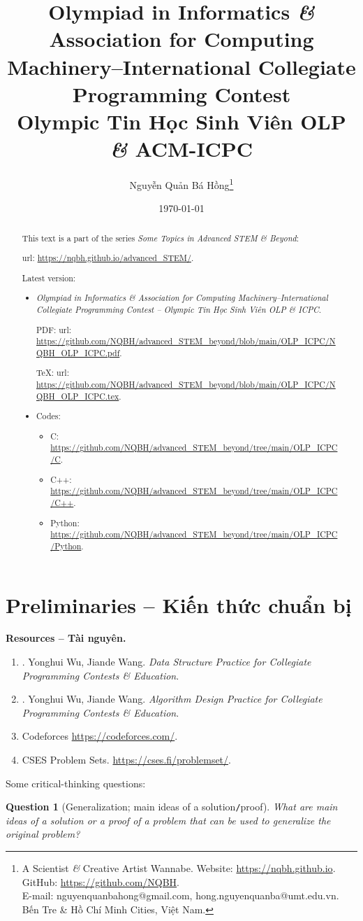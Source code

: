 \documentclass{article}
\title{Olympiad in Informatics {\it\&} Association for Computing Machinery--International Collegiate Programming Contest\\Olympic Tin Học Sinh Viên OLP {\it\&} ACM-ICPC}
\author{Nguyễn Quản Bá Hồng\footnote{A Scientist {\it\&} Creative Artist Wannabe. Website: \url{https://nqbh.github.io}. GitHub: \url{https://github.com/NQBH}.\\E-mail: {\sf nguyenquanbahong@gmail.com, hong.nguyenquanba@umt.edu.vn}. Bến Tre \& Hồ Chí Minh Cities, Việt Nam.}}
\date{\today}
\newtheorem{question}{Question}
\begin{document}
\maketitle
\begin{abstract}
	This text is a part of the series {\it Some Topics in Advanced STEM \& Beyond}:
	
	{\sc url}: \url{https://nqbh.github.io/advanced_STEM/}.
	
	Latest version:
	\begin{itemize}
		\item {\it Olympiad in Informatics \& Association for Computing Machinery--International Collegiate Programming Contest -- Olympic Tin Học Sinh Viên OLP \& ICPC}.
		
		PDF: {\sc url}: \url{https://github.com/NQBH/advanced_STEM_beyond/blob/main/OLP_ICPC/NQBH_OLP_ICPC.pdf}.
		
		\TeX: {\sc url}: \url{https://github.com/NQBH/advanced_STEM_beyond/blob/main/OLP_ICPC/NQBH_OLP_ICPC.tex}.
		\item Codes:
		\begin{itemize}
			\item C: \url{https://github.com/NQBH/advanced_STEM_beyond/tree/main/OLP_ICPC/C}.
			\item C++: \url{https://github.com/NQBH/advanced_STEM_beyond/tree/main/OLP_ICPC/C++}.
			\item Python: \url{https://github.com/NQBH/advanced_STEM_beyond/tree/main/OLP_ICPC/Python}.
		\end{itemize}
	\end{itemize}
\end{abstract}
\tableofcontents


\section*{Preliminaries -- Kiến thức chuẩn bị}
\textbf{\textsf{Resources -- Tài nguyên.}}
\begin{enumerate}
	\item \cite{Wu_Wang2016}. {\sc Yonghui Wu, Jiande Wang}. {\it Data Structure Practice for Collegiate Programming Contests \& Education}.
	\item \cite{Wu_Wang2018}. {\sc Yonghui Wu, Jiande Wang}. {\it Algorithm Design Practice for Collegiate Programming Contests \& Education}.	
	\item Codeforces \url{https://codeforces.com/}.
	\item CSES Problem Sets. \url{https://cses.fi/problemset/}.
\end{enumerate}
Some critical-thinking questions:
\begin{question}[Generalization; main ideas of a solution{\tt/}proof]
	What are main ideas of a solution or a proof of a problem that can be used to generalize the original problem?
\end{question}
\end{document}
